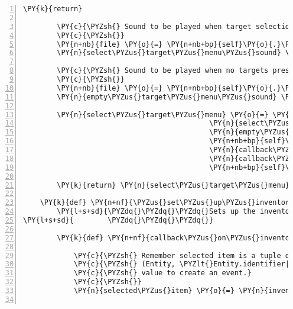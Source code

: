 \begin{Verbatim}[commandchars=\\\{\},numbers=left,firstnumber=1,stepnumber=1]
            \PY{k}{return}

        \PY{c}{\PYZsh{} Sound to be played when target selection menu is opened}
        \PY{c}{\PYZsh{}}
        \PY{n+nb}{file} \PY{o}{=} \PY{n+nb+bp}{self}\PY{o}{.}\PY{n}{assets}\PY{o}{.}\PY{n}{fetch}\PY{p}{(}\PY{l+s}{\PYZsq{}}\PY{l+s}{select\PYZus{}target\PYZus{}menu.ogg}\PY{l+s}{\PYZsq{}}\PY{p}{)}
        \PY{n}{select\PYZus{}target\PYZus{}menu\PYZus{}sound} \PY{o}{=} \PY{n}{pygame}\PY{o}{.}\PY{n}{mixer}\PY{o}{.}\PY{n}{Sound}\PY{p}{(}\PY{n+nb}{file}\PY{p}{)}

        \PY{c}{\PYZsh{} Sound to be played when no targets present to be selected}
        \PY{c}{\PYZsh{}}
        \PY{n+nb}{file} \PY{o}{=} \PY{n+nb+bp}{self}\PY{o}{.}\PY{n}{assets}\PY{o}{.}\PY{n}{fetch}\PY{p}{(}\PY{l+s}{\PYZsq{}}\PY{l+s}{empty\PYZus{}target\PYZus{}menu.ogg}\PY{l+s}{\PYZsq{}}\PY{p}{)}
        \PY{n}{empty\PYZus{}target\PYZus{}menu\PYZus{}sound} \PY{o}{=} \PY{n}{pygame}\PY{o}{.}\PY{n}{mixer}\PY{o}{.}\PY{n}{Sound}\PY{p}{(}\PY{n+nb}{file}\PY{p}{)}

        \PY{n}{select\PYZus{}target\PYZus{}menu} \PY{o}{=} \PY{n}{EntityMenuList}\PY{p}{(}\PY{p}{[}\PY{p}{]}\PY{p}{,}
                                            \PY{n}{select\PYZus{}target\PYZus{}menu\PYZus{}sound}\PY{p}{,}
                                            \PY{n}{empty\PYZus{}target\PYZus{}menu\PYZus{}sound}\PY{p}{,}
                                            \PY{n+nb+bp}{self}\PY{o}{.}\PY{n}{channel\PYZus{}system}\PY{p}{,}
                                            \PY{n}{callback\PYZus{}on\PYZus{}target\PYZus{}selected}\PY{p}{,}
                                            \PY{n}{callback\PYZus{}on\PYZus{}target\PYZus{}menu\PYZus{}exit}\PY{p}{,}
                                            \PY{n+nb+bp}{self}\PY{o}{.}\PY{n}{tts\PYZus{}engine}\PY{p}{)}

        \PY{k}{return} \PY{n}{select\PYZus{}target\PYZus{}menu}

    \PY{k}{def} \PY{n+nf}{\PYZus{}set\PYZus{}up\PYZus{}inventory\PYZus{}menu}\PY{p}{(}\PY{n+nb+bp}{self}\PY{p}{)}\PY{p}{:}
        \PY{l+s+sd}{\PYZdq{}\PYZdq{}\PYZdq{}Sets up the inventory menu list.}
\PY{l+s+sd}{        \PYZdq{}\PYZdq{}\PYZdq{}}

        \PY{k}{def} \PY{n+nf}{callback\PYZus{}on\PYZus{}inventory\PYZus{}item\PYZus{}selected}\PY{p}{(}\PY{n}{inventory\PYZus{}menu}\PY{p}{)}\PY{p}{:}

            \PY{c}{\PYZsh{} Remember selected item is a tuple of}
            \PY{c}{\PYZsh{} (Entity, \PYZlt{}Entity.identifier|location\PYZgt{}) and we need the second}
            \PY{c}{\PYZsh{} value to create an event.}
            \PY{c}{\PYZsh{}}
            \PY{n}{selected\PYZus{}item} \PY{o}{=} \PY{n}{inventory\PYZus{}menu}\PY{o}{.}\PY{n}{list}\PY{p}{[}\PY{n}{inventory\PYZus{}menu}\PY{o}{.}\PY{n}{list\PYZus{}index}\PY{p}{]}\PY{p}{[}\PY{l+m+mi}{1}\PY{p}{]}


\end{Verbatim}
